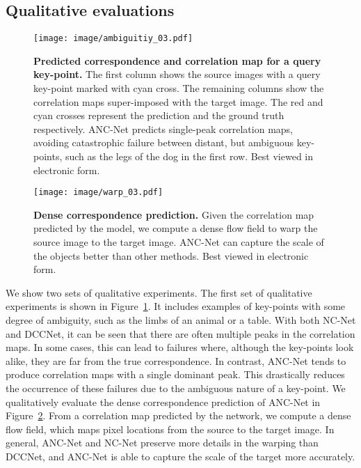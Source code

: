 \documentclass[10pt,twocolumn,letterpaper]{article}
\begin{document}
\subsection{Qualitative evaluations}


\begin{figure}[!th]
\centering
  \texttt{[image: image/ambiguitiy\_03.pdf]}
  \caption{\textbf{Predicted correspondence and correlation map for a query key-point.}
  The first column shows the source images with a query key-point marked with cyan cross. The remaining columns show the correlation maps super-imposed with the target image. 
  The red and cyan crosses represent the prediction and the ground truth respectively.   ANC-Net predicts single-peak correlation maps, avoiding catastrophic failure between distant, but ambiguous key-points, such as the legs of the dog in the first row. 
  Best viewed in electronic form.
  }
\label{fig:orthogonal}
\end{figure}


\begin{figure}[!th]
\centering
  \texttt{[image: image/warp\_03.pdf]}
   \caption{\textbf{Dense correspondence prediction.} Given the correlation map predicted by the model, we compute a dense flow field to warp the source image to the target image. ANC-Net can capture the scale of the objects better than other methods. Best viewed in electronic form.}
\label{fig:warp}
\end{figure}

We show two sets of qualitative experiments. 
The first set of qualitative experiments is shown in Figure~\ref{fig:orthogonal}.
It includes examples of key-points with some degree of ambiguity, such as the limbs of an animal or a table. 
With both NC-Net and DCCNet, it can be seen that there are often multiple peaks in the correlation maps.
In some cases, this can lead to failures where, although the key-points look alike, they are far from the true correspondence.
In contrast, ANC-Net tends to produce correlation maps with a single dominant peak.
This drastically reduces the occurrence of these failures due to the ambiguous nature of a key-point.
We qualitatively evaluate the dense correspondence prediction of ANC-Net in Figure~\ref{fig:warp}.
From a correlation map predicted by the network, we compute a dense flow field, which maps pixel locations from the source to the target image. 
In general, ANC-Net and NC-Net preserve more details in the warping than DCCNet, and ANC-Net is able to capture the scale of the target  more accurately.
\end{document}
